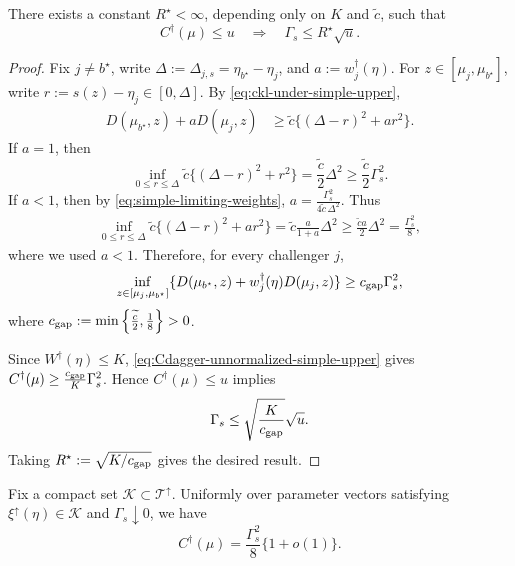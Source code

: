 \documentclass[10pt]{article}
\theoremstyle{plain}
\begin{document}
\begin{lemma}
\label{lem:nonlocal-exclusion-simple-upper}
There exists a constant \(R^\star<\infty\), depending only on \(K\) and
\(\widetilde{c}\), such that
\[
    C^\dagger(\mu)\le u
    \quad\Longrightarrow\quad
    \Gamma_s\le R^\star\sqrt u.
\]
\end{lemma}

\begin{proof}
Fix \(j\neq b^\star\), write
$\Delta:=\Delta_{j,s}=\eta_{b^\star}-\eta_j$,
    and
    $a:=w_j^\dagger(\eta)$.
For \(z\in[\mu_j,\mu_{b^\star}]\), write
    $r:=s(z)-\eta_j\in[0,\Delta]$.
By \eqref{eq:ckl-under-simple-upper},
\[
\begin{aligned}
    D(\mu_{b^\star},z)+aD(\mu_j,z)
    &\ge
    \widetilde{c}\{(\Delta-r)^2+a r^2\}.
\end{aligned}
\]
If \(a=1\), then
\[
    \inf_{0\le r\le\Delta}
    \widetilde{c}\{(\Delta-r)^2+r^2\}
    =
    \frac{\widetilde{c}}{2}\Delta^2
    \ge
    \frac{\widetilde{c}}{2}\Gamma_s^2.
\]
If \(a<1\), then by \eqref{eq:simple-limiting-weights},
    $a=\frac{\Gamma_s^2}{4\widetilde{c}\,\Delta^2}$.
Thus
\[
\begin{aligned}
    \inf_{0\le r\le\Delta}
    \widetilde{c}\{(\Delta-r)^2+a r^2\}
    =
    \widetilde{c}\frac{a}{1+a}\Delta^2  
    \ge
    \frac{\widetilde{c} a}{2}\Delta^2
    =
    \frac{\Gamma_s^2}{8},
\end{aligned}
\]
where we used \(a<1\).  Therefore, for every challenger \(j\),
\[
    \inf_{z\in[\mu_j,\mu_{b^\star}]}
    \{D(\mu_{b^\star},z)+w_j^\dagger(\eta) D(\mu_j,z)\}
    \ge
    c_{\rm gap}\Gamma_s^2,
\]
where $c_{\rm gap}:=
    \min\left\{\frac{\widetilde{c}}{2},\frac18\right\}>0$.

Since \(W^\dagger(\eta)\le K\), \eqref{eq:Cdagger-unnormalized-simple-upper} gives $C^\dagger(\mu)
    \ge
    \frac{c_{\rm gap}}{K}\Gamma_s^2$.
Hence \(C^\dagger(\mu)\le u\) implies
\[
    \Gamma_s\le \sqrt{\frac K{c_{\rm gap}}}\sqrt u.
\]
Taking $R^\star:=\sqrt{K/c_{\rm gap}}$ gives the desired result. 


\end{proof}

\begin{lemma}
\label{lem:Cdagger-local-expansion-simple-upper}
Fix a compact set \(\mathcal K\subset\mathcal T^\uparrow\).  Uniformly over
parameter vectors satisfying
    $\xi^\uparrow(\eta)\in\mathcal K$
    and
    $\Gamma_s\downarrow0$,
we have
\[
    C^\dagger(\mu)
    =
    \frac{\Gamma_s^2}{8}\{1+o(1)\}.
\]
\end{lemma}
\end{document}
